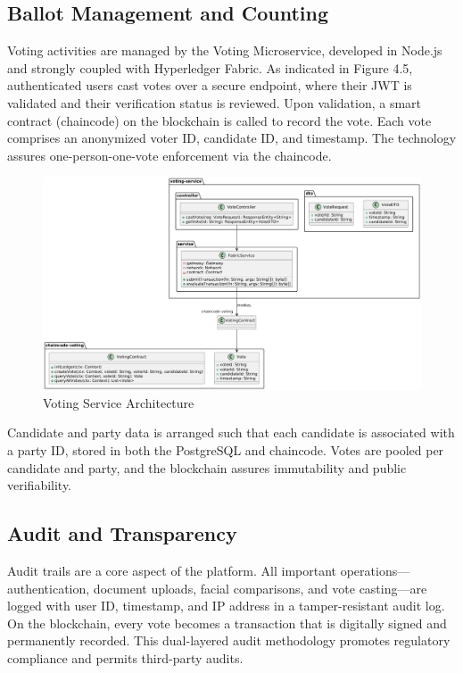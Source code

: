 \documentclass[a4paper,10pt]{report}
\begin{document}
\subsection{Ballot Management and Counting}

Voting activities are managed by the Voting Microservice, developed in Node.js and strongly coupled with Hyperledger Fabric.  As indicated in Figure 4.5, authenticated users cast votes over a secure endpoint, where their JWT is validated and their verification status is reviewed.  Upon validation, a smart contract (chaincode) on the blockchain is called to record the vote.  Each vote comprises an anonymized voter ID, candidate ID, and timestamp.  The technology assures one-person-one-vote enforcement via the chaincode.
\begin{figure}[H]
  \centering
  \includegraphics[width=1.0\textwidth]{votingService.png}
  \caption{Voting Service Architecture}
  \label{fig:full}
\end{figure}

Candidate and party data is arranged such that each candidate is associated with a party ID, stored in both the PostgreSQL and chaincode.  Votes are pooled per candidate and party, and the blockchain assures immutability and public verifiability.

\subsection{Audit and Transparency}

Audit trails are a core aspect of the platform.  All important operations—authentication, document uploads, facial comparisons, and vote casting—are logged with user ID, timestamp, and IP address in a tamper-resistant audit log.  On the blockchain, every vote becomes a transaction that is digitally signed and permanently recorded.  This dual-layered audit methodology promotes regulatory compliance and permits third-party audits.
\end{document}
